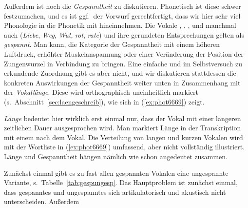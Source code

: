 Außerdem ist noch die \textit{Gespanntheit} zu diskutieren.
Phonetisch ist diese schwer festzumachen, und es ist ggf.\ der Vorwurf gerechtfertigt, dass wir hier sehr viel Phonologie in die Phonetik mit hineinnehmen.
Die Vokale \textipa{[i]}, \textipa{[e]}, \textipa{[u]}, \textipa{[o]} und manchmal auch \textipa{[a]} (\textit{Liebe}, \textit{Weg}, \textit{Wut}, \textit{rot}, \textit{rate}) und ihre gerundeten Entsprechungen gelten als \textit{gespannt}.
Man kann, die Kategorie der Gespanntheit mit einem höheren Luftdruck, erhöhter Muskelanspannung oder einer Veränderung der Position der Zungenwurzel in Verbindung zu bringen.
Eine einfache und im Selbstversuch zu erkundende Zuordnung gibt es aber nicht, und wir diskutieren stattdessen die konkreten Auswirkungen der Gespanntheit weiter unten in Zusammenhang mit der \textit{Vokallänge}.
Diese wird orthographisch uneinheitlich markiert (s.\ Abschnitt~\ref{sec:laengeschreib}), wie sich in (\ref{ex:phot6669}) zeigt.

\begin{exe}
  \ex\label{ex:phot6669}
  \begin{xlist}
  \end{xlist}
\end{exe}

\textit{Länge} bedeutet hier wirklich erst einmal nur, dass der Vokal mit einer längeren zeitlichen Dauer ausgesprochen wird.
Man markiert Länge in der Transkription mit einem \textipa{[:]} nach dem Vokal.
Die Verteilung von langen und kurzen Vokalen wird mit der Wortliste in (\ref{ex:phot6669}) umfassend, aber nicht vollständig illustriert.
Länge und Gespanntheit hängen nämlich wie schon angedeutet zusammen.

Zunächst einmal gibt es zu fast allen gespannten Vokalen eine ungespannte Variante, s.\ Tabelle~\ref{tab:gespungesp}.
Das Hauptproblem ist zunächst einmal, dass gespanntes und ungespanntes \textipa{[a]} sich artikulatorisch und akustisch nicht unterscheiden.
Außerdem 

